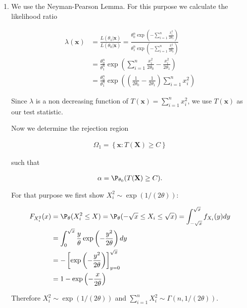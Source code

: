 \begin{solution}

\phantom{}

\begin{enumerate}[label = (\alph*)]
  \item We use the Neyman-Pearson Lemma. For this purpose we calculate the likelihood ratio
  
  \begin{align*}
    \lambda(\textbf{x}) &= \frac{L(\theta_1 | \textbf{x})}{L(\theta_0 | \textbf{x})}
    = \frac{\theta_0^n\exp\left(-\sum_{i=1}^n\frac{x_i^2}{2\theta_1}\right)}{\theta_1^n\exp\left(-\sum_{i=1}^n\frac{x_i^2}{2\theta_0}\right)} \\
    &= \frac{\theta_0^n}{\theta_1^n} \exp\left(\sum_{i=1}^n\frac{x_i^2}{2\theta_0}-\frac{x_i^2}{2\theta_1}\right) \\
    &= \frac{\theta_0^n}{\theta_1^n} \exp\left(\left(\frac{1}{2\theta_0}-\frac{1}{2\theta_1}\right)\sum_{i=1}^n x_i^2\right)
  \end{align*}

  Since $\lambda$ is a non decreasing function of 
    $T(\textbf{x}) = \sum_{i=1}^n x_i^2$,
  we use $T(\textbf{x})$ as our test statistic.

  Now we determine the rejection region

  \begin{align*}
    \Omega_1 = \left\{ \textbf{x}:  T(\textbf{X}) \geq C \right\}
  \end{align*}

  such that

  \begin{align*}
    \alpha = \P_{\theta_0}(T(\textbf{X}) \geq C).
  \end{align*}

  For that purpose we first show $X_i^2 \sim \exp(1/(2\theta))$:

  \begin{align*}
    F_{X_i^2}(x) &= \P_\theta(X_i^2 \leq X)
    = \P_\theta(-\sqrt{x} \leq X_i \leq \sqrt{x})
    = \int_{-\sqrt{x}}^{\sqrt{x}} f_{X_i}(y) dy \\
    &= \int_{0}^{\sqrt{x}} \frac{y}{\theta} \exp\left(-\frac{y^2}{2\theta}\right) dy \\
    &= -\left[\exp\left(-\frac{y^2}{2\theta}\right)\right]_{y = 0}^{\sqrt{x}} \\
    &= 1 - \exp\left(-\frac{x}{2\theta}\right)
  \end{align*}
  
  Therefore $X_i^2 \sim \exp(1/(2\theta))$ and $\sum_{i=1}^n X_i^2 \sim \Gamma(n, 1/(2\theta))$.


\end{enumerate}
\end{solution}
